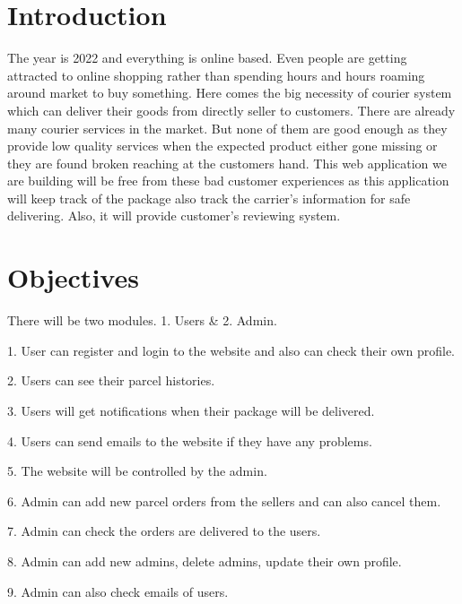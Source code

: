 \documentclass[12pt]{article}
\begin{document}
\be

\setcounter{page}{1}
\pagestyle{fancy}
\fancyhf{}
\rhead{\thepage}
\lhead{\GroupName; \titleofdoc}

\section*{Introduction} %

The year is 2022 and everything is online based. Even people are getting attracted to online shopping rather than spending hours and hours roaming around market to buy something. Here comes the big necessity of courier system which can deliver their goods from directly seller to customers. There are already many courier services in the market. But none of them are good enough as they provide low quality services when the expected product either gone missing or they are found broken reaching at the customers hand. This web application we are building will be free from these bad customer experiences as this application will keep track of the package also track the carrier’s information for safe delivering. Also, it will provide customer’s reviewing system.

\section*{Objectives}

There will be two modules. 1. Users & 2. Admin.

1.	User can register and login to the website and also can check their own profile.

2.	Users can see their parcel histories. 

3.	Users will get notifications when their package will be delivered.

4.	Users can send emails to the website if they have any problems.

5.	The website will be controlled by the admin.

6.	Admin can add new parcel orders from the sellers and can also cancel them.

7.	Admin can check the orders are delivered to the users.

8.	Admin can add new admins, delete admins, update their own profile.

9.	Admin can also check emails of users.
\end{document}
